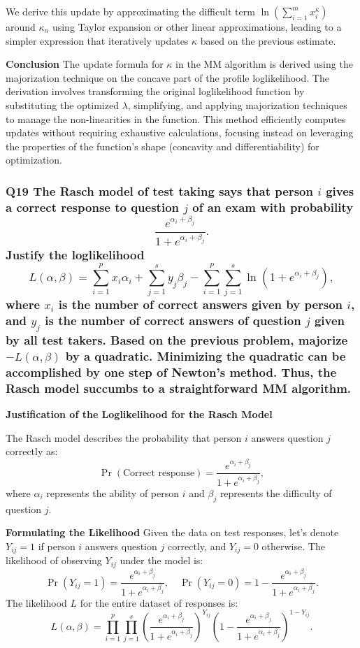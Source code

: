 \documentclass[8pt]{article}
\begin{document}
{We derive this update by approximating the difficult term \(\ln \left(\sum_{i=1}^m x_i^\kappa\right)\) around \(\kappa_n\) using Taylor expansion or other linear approximations, leading to a simpler expression that iteratively updates \(\kappa\) based on the previous estimate.

\textbf{Conclusion}
The update formula for \(\kappa\) in the MM algorithm is derived using the majorization technique on the concave part of the profile loglikelihood. The derivation involves transforming the original loglikelihood function by substituting the optimized \(\lambda\), simplifying, and applying majorization techniques to manage the non-linearities in the function. This method efficiently computes updates without requiring exhaustive calculations, focusing instead on leveraging the properties of the function's shape (concavity and differentiability) for optimization.

\subsubsection*{Q19 The Rasch model of test taking says that person \(i\) gives a correct response to question \(j\) of an exam with probability
\[
\frac{e^{\alpha_i + \beta_j}}{1 + e^{\alpha_i + \beta_j}}.
\]
Justify the loglikelihood
\[
L(\alpha, \beta) = \sum_{i=1}^p x_i \alpha_i + \sum_{j=1}^s y_j \beta_j - \sum_{i=1}^p \sum_{j=1}^s \ln(1 + e^{\alpha_i + \beta_j}),
\]
where \(x_i\) is the number of correct answers given by person \(i\), and \(y_j\) is the number of correct answers of question \(j\) given by all test takers. Based on the previous problem, majorize \(-L(\alpha, \beta)\) by a quadratic. Minimizing the quadratic can be accomplished by one step of Newton’s method. Thus, the Rasch model succumbs to a straightforward MM algorithm.}

\textbf{Justification of the Loglikelihood for the Rasch Model}

The Rasch model describes the probability that person \(i\) answers question \(j\) correctly as:
\[
\Pr(\text{Correct response}) = \frac{e^{\alpha_i + \beta_j}}{1 + e^{\alpha_i + \beta_j}},
\]
where \(\alpha_i\) represents the ability of person \(i\) and \(\beta_j\) represents the difficulty of question \(j\).

\textbf{Formulating the Likelihood}
Given the data on test responses, let's denote \(Y_{ij} = 1\) if person \(i\) answers question \(j\) correctly, and \(Y_{ij} = 0\) otherwise. The likelihood of observing \(Y_{ij}\) under the model is:
\[
\Pr(Y_{ij} = 1) = \frac{e^{\alpha_i + \beta_j}}{1 + e^{\alpha_i + \beta_j}}, \quad \Pr(Y_{ij} = 0) = 1 - \frac{e^{\alpha_i + \beta_j}}{1 + e^{\alpha_i + \beta_j}}.
\]
The likelihood \(L\) for the entire dataset of responses is:
\[
L(\alpha, \beta) = \prod_{i=1}^p \prod_{j=1}^s \left(\frac{e^{\alpha_i + \beta_j}}{1 + e^{\alpha_i + \beta_j}}\right)^{Y_{ij}} \left(1 - \frac{e^{\alpha_i + \beta_j}}{1 + e^{\alpha_i + \beta_j}}\right)^{1 - Y_{ij}}.
\]

}
\end{document}
